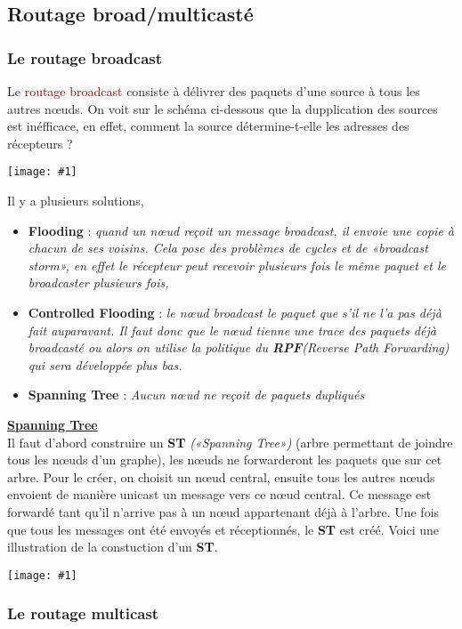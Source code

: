 \documentclass{article}
\newcommand{\red}[1]{\textcolor{darkred}{#1}}
\newcommand{\imgR}[2]{\begin{center}\texttt{[image: \#1]}\end{center}}
\newcommand{\bfp}[2]{\item \textbf{#1} : \textit{#2}}
\begin{document}
\subsection{Routage broad/multicasté}

\subsubsection{Le routage broadcast}

Le \red{routage broadcast} consiste à délivrer des paquets d'une source à tous les autres n\oe uds. On voit sur
le schéma ci-dessous que la dupplication des sources est inéfficace, en effet, comment la source détermine-t-elle
les adresses des récepteurs ?

\imgR{CN_097.png}{300}

Il y a plusieurs solutions,
\begin{itemize}
\bfp{Flooding}{quand un n\oe ud reçoit un message broadcast, il envoie une copie à chacun de ses voisins. Cela 
pose des problèmes de cycles et de «broadcast storm», en effet le récepteur peut recevoir plusieurs fois le même 
paquet et le broadcaster plusieurs fois,}
\bfp{Controlled Flooding}{le n\oe ud broadcast le paquet que s'il ne l'a pas déjà fait auparavant. Il faut donc 
que le n\oe ud tienne une trace des paquets déjà broadcasté ou alors on utilise la politique du 
\textbf{RPF}\textit{(Reverse Path Forwarding)} qui sera développée plus bas.}
\bfp{Spanning Tree}{Aucun n\oe ud ne reçoit de paquets dupliqués} \\
\end{itemize}

\noindent\textbf{\underline{Spanning Tree}} \\

\noindent Il faut d'abord construire un \textbf{ST} \textit{(«Spanning Tree»)} (arbre permettant de joindre tous 
les n\oe uds d'un graphe), les n\oe uds ne forwarderont les paquets que sur cet arbre. Pour le créer, on choisit 
un n\oe ud central, ensuite tous les autres n\oe uds envoient de manière unicast un message vers ce n\oe ud 
central. Ce message est forwardé tant qu'il n'arrive pas à un n\oe ud appartenant déjà à l'arbre. Une fois que 
tous les messages ont été envoyés et réceptionnés, le \textbf{ST} est créé. Voici une illustration de la 
constuction d'un \textbf{ST}.

\imgR{CN_098.png}{300}

\subsubsection{Le routage multicast}
\end{document}
